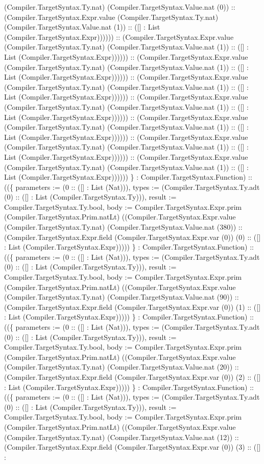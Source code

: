 \documentclass[11pt]{article}
\begin{document}
(Compiler.TargetSyntax.Ty.nat) (Compiler.TargetSyntax.Value.nat (0)) :: (Compiler.TargetSyntax.Expr.value (Compiler.TargetSyntax.Ty.nat) (Compiler.TargetSyntax.Value.nat (1)) :: ([] : List (Compiler.TargetSyntax.Expr)))))) :: (Compiler.TargetSyntax.Expr.value (Compiler.TargetSyntax.Ty.nat) (Compiler.TargetSyntax.Value.nat (1)) :: ([] : List (Compiler.TargetSyntax.Expr)))))) :: (Compiler.TargetSyntax.Expr.value (Compiler.TargetSyntax.Ty.nat) (Compiler.TargetSyntax.Value.nat (1)) :: ([] : List (Compiler.TargetSyntax.Expr)))))) :: (Compiler.TargetSyntax.Expr.value (Compiler.TargetSyntax.Ty.nat) (Compiler.TargetSyntax.Value.nat (1)) :: ([] : List (Compiler.TargetSyntax.Expr)))))) :: (Compiler.TargetSyntax.Expr.value (Compiler.TargetSyntax.Ty.nat) (Compiler.TargetSyntax.Value.nat (1)) :: ([] : List (Compiler.TargetSyntax.Expr)))))) :: (Compiler.TargetSyntax.Expr.value (Compiler.TargetSyntax.Ty.nat) (Compiler.TargetSyntax.Value.nat (1)) :: ([] : List (Compiler.TargetSyntax.Expr)))))) :: (Compiler.TargetSyntax.Expr.value (Compiler.TargetSyntax.Ty.nat) (Compiler.TargetSyntax.Value.nat (1)) :: ([] : List (Compiler.TargetSyntax.Expr)))))) :: (Compiler.TargetSyntax.Expr.value (Compiler.TargetSyntax.Ty.nat) (Compiler.TargetSyntax.Value.nat (1)) :: ([] : List (Compiler.TargetSyntax.Expr)))))) \} : Compiler.TargetSyntax.Function) :: ((\{ parameters := (0 :: ([] : List (Nat))), types := (Compiler.TargetSyntax.Ty.adt (0) :: ([] : List (Compiler.TargetSyntax.Ty))), result := Compiler.TargetSyntax.Ty.bool, body := Compiler.TargetSyntax.Expr.prim (Compiler.TargetSyntax.Prim.natLt) ((Compiler.TargetSyntax.Expr.value (Compiler.TargetSyntax.Ty.nat) (Compiler.TargetSyntax.Value.nat (380)) :: (Compiler.TargetSyntax.Expr.field (Compiler.TargetSyntax.Expr.var (0)) (0) :: ([] : List (Compiler.TargetSyntax.Expr))))) \} : Compiler.TargetSyntax.Function) :: ((\{ parameters := (0 :: ([] : List (Nat))), types := (Compiler.TargetSyntax.Ty.adt (0) :: ([] : List (Compiler.TargetSyntax.Ty))), result := Compiler.TargetSyntax.Ty.bool, body := Compiler.TargetSyntax.Expr.prim (Compiler.TargetSyntax.Prim.natLt) ((Compiler.TargetSyntax.Expr.value (Compiler.TargetSyntax.Ty.nat) (Compiler.TargetSyntax.Value.nat (90)) :: (Compiler.TargetSyntax.Expr.field (Compiler.TargetSyntax.Expr.var (0)) (1) :: ([] : List (Compiler.TargetSyntax.Expr))))) \} : Compiler.TargetSyntax.Function) :: ((\{ parameters := (0 :: ([] : List (Nat))), types := (Compiler.TargetSyntax.Ty.adt (0) :: ([] : List (Compiler.TargetSyntax.Ty))), result := Compiler.TargetSyntax.Ty.bool, body := Compiler.TargetSyntax.Expr.prim (Compiler.TargetSyntax.Prim.natLt) ((Compiler.TargetSyntax.Expr.value (Compiler.TargetSyntax.Ty.nat) (Compiler.TargetSyntax.Value.nat (20)) :: (Compiler.TargetSyntax.Expr.field (Compiler.TargetSyntax.Expr.var (0)) (2) :: ([] : List (Compiler.TargetSyntax.Expr))))) \} : Compiler.TargetSyntax.Function) :: ((\{ parameters := (0 :: ([] : List (Nat))), types := (Compiler.TargetSyntax.Ty.adt (0) :: ([] : List (Compiler.TargetSyntax.Ty))), result := Compiler.TargetSyntax.Ty.bool, body := Compiler.TargetSyntax.Expr.prim (Compiler.TargetSyntax.Prim.natLt) ((Compiler.TargetSyntax.Expr.value (Compiler.TargetSyntax.Ty.nat) (Compiler.TargetSyntax.Value.nat (12)) :: (Compiler.TargetSyntax.Expr.field (Compiler.TargetSyntax.Expr.var (0)) (3) :: ([] : 
\end{document}

